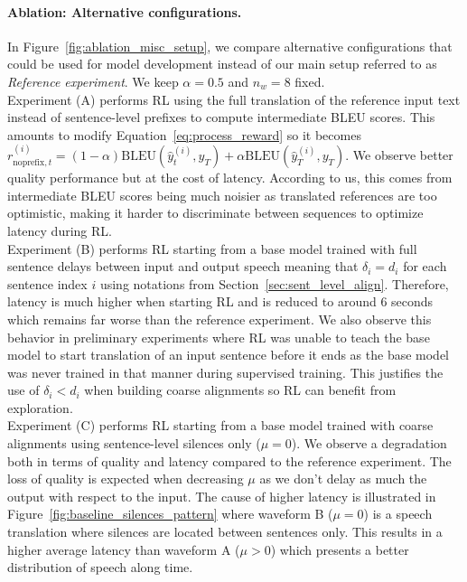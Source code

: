 \paragraph{Ablation: Alternative configurations.}
\label{sec:ablation_misc}

In Figure~\ref{fig:ablation_misc_setup}, we compare alternative configurations that could be used for model development instead of our main setup referred to as \textit{Reference experiment}. We keep $\alpha=0.5$ and $n_w=8$ fixed. \\

Experiment (A) performs RL using the full translation of the reference input text instead of sentence-level prefixes to compute intermediate BLEU scores. This amounts to modify Equation~\ref{eq:process_reward} so it becomes $r^{(i)}_{\mathrm{noprefix},t} = (1 - \alpha) \mathrm{BLEU} ( \hat{y}^{(i)}_{t}, y_{T} ) + \alpha \mathrm{BLEU} ( \hat{y}^{(i)}_{T}, y_{T} )$. We observe better quality performance but at the cost of latency. According to us, this comes from intermediate BLEU scores being much noisier as translated references are too optimistic, making it harder to discriminate between sequences to optimize latency during RL. \\

Experiment (B) performs RL starting from a base model trained with full sentence delays between input and output speech meaning that $\delta_i=d_i$ for each sentence index $i$ using notations from Section~\ref{sec:sent_level_align}. Therefore, latency is much higher when starting RL and is reduced to around 6 seconds which remains far worse than the reference experiment. We also observe this behavior in preliminary experiments where RL was unable to teach the base model to start translation of an input sentence before it ends as the base model was never trained in that manner during supervised training. This justifies the use of $\delta_i<d_i$ when building coarse alignments so RL can benefit from exploration. \\

\vspace{-1em}
Experiment (C) performs RL starting from a base model trained with coarse alignments using sentence-level silences only ($\mu=0$). We observe a degradation both in terms of quality and latency compared to the reference experiment. The loss of quality is expected when decreasing $\mu$ as we don't delay as much the output with respect to the input. The cause of higher latency is illustrated in Figure~\ref{fig:baseline_silences_pattern} where waveform B ($\mu=0$) is a speech translation where silences are located between sentences only. This results in a higher average latency than waveform A ($\mu>0$) which presents a better distribution of speech along time.


